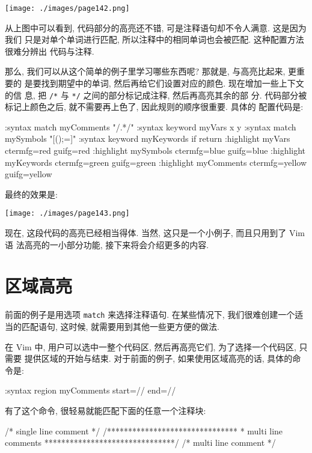 \begin{center}
    \texttt{[image: ./images/page142.png]}
\end{center}

从上图中可以看到, 代码部分的高亮还不错, 可是注释语句却不令人满意. 这是因为我们
只是对单个单词进行匹配, 所以注释中的相同单词也会被匹配. 这种配置方法很难分辨出
代码与注释.

那么, 我们可以从这个简单的例子里学习哪些东西呢? 那就是, 与高亮比起来, 更重要的
是要找到期望中的单词, 然后再给它们设置对应的颜色. 现在增加一些上下文的信
息, 把 \verb'/*' 与 \verb'*/' 之间的部分标记成注释, 然后再高亮其余的部
分. 代码部分被标记上颜色之后, 就不需要再上色了, 因此规则的顺序很重要. 具体的
配置代码是:
\begin{vimcode}
:syntax match myComments "/\*.*\*/"
:syntax keyword myVars x y
:syntax match mySymbols "[{}();=]"
:syntax keyword myKeywords if return
:highlight myVars ctermfg=red guifg=red
:highlight mySymbols ctermfg=blue guifg=blue
:highlight myKeywords ctermfg=green guifg=green
:highlight myComments ctermfg=yellow guifg=yellow
\end{vimcode}
最终的效果是:
\begin{center}
\texttt{[image: ./images/page143.png]}
\end{center}

现在, 这段代码的高亮已经相当得体. 当然, 这只是一个小例子, 而且只用到了 Vim 语
法高亮的一小部分功能, 接下来将会介绍更多的内容.

\section{区域高亮}
\label{sec:syntax_regions}

前面的例子是用选项 \texttt{match} 来选择注释语句. 在某些情况下,
我们很难创建一个适当的匹配语句, 这时候, 就需要用到其他一些更方便的做法.

在 Vim 中, 用户可以选中一整个代码区, 然后再高亮它们, 为了选择一个代码区, 只需要
提供区域的开始与结束. 对于前面的例子, 如果使用区域高亮的话, 具体的命令是:
\begin{vimcode}
:syntax region myComments start=/\/\*/ end=/\*\//
\end{vimcode}
有了这个命令, 很轻易就能匹配下面的任意一个注释块:
\begin{vimcode}
/* single line comment */
/*******************************
 *  multi line comments
 *******************************/
/* multi line comment
 */
\end{vimcode}

